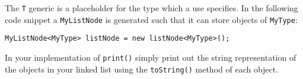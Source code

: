 \documentclass[12pt]{scrartcl}
\begin{document}
The \texttt{T} generic is a placeholder for the type which 
a use specifies. In the following code snippet a 
\texttt{MyListNode} is generated such that it can store 
objects of \texttt{MyType}:

\texttt{MyListNode<MyType> listNode = new listNode<MyType>();}

In your implementation of \texttt{print()} simply print 
out the string representation of the objects in your linked list 
using the \texttt{toString()} method of each object.
\end{document}
